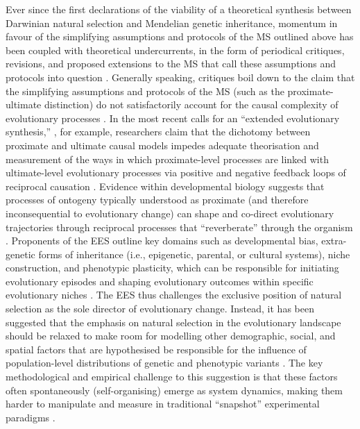 Ever since the first declarations of the viability of a theoretical synthesis between Darwinian natural selection and Mendelian genetic inheritance, momentum in favour of the simplifying assumptions and protocols of the MS outlined above has been coupled with theoretical undercurrents, in the form of periodical critiques, revisions, and proposed extensions to the MS that call these assumptions and protocols into question \citep[see, for example][]{Waddington1950, Pattee1971,Gould1980,Levins1985,Ingold1990,Ingold1995,Odling-Schmee2003,Piggliuci2007}. Generally speaking, critiques boil down to the claim that the simplifying assumptions and protocols of the MS (such as the proximate-ultimate distinction) do not satisfactorily account for the causal complexity of evolutionary processes \citep{Laland2011}. In the most recent calls for an ``extended evolutionary synthesis,'' \citep[EES, see][]{Pigliucci2007}, for example, researchers claim that the dichotomy between proximate and ultimate causal models impedes adequate theorisation and measurement of the ways in which proximate-level processes are linked with ultimate-level evolutionary processes via positive and negative feedback loops of reciprocal causation \citep{Pigliucci2007,Laland2011,Laland2013,Mesoudi2013,Laland2015}. Evidence within developmental biology suggests that processes of ontogeny typically understood as proximate (and therefore inconsequential to evolutionary change) can shape and co-direct evolutionary trajectories through reciprocal processes that ``reverberate'' through the organism \citep{Laland2013}. Proponents of the EES outline key domains such as developmental bias, extra-genetic forms of inheritance (i.e., epigenetic, parental, or cultural systems), niche construction, and phenotypic plasticity, which can be responsible for initiating evolutionary episodes and shaping evolutionary outcomes within specific evolutionary niches \citep{Laland2015}.  The EES thus challenges the exclusive position of natural selection as the sole director of evolutionary change.  Instead, it has been suggested that the emphasis on natural selection in the evolutionary landscape should be relaxed to make room for modelling other demographic, social, and spatial factors that are hypothesised be responsible for the influence of population-level distributions of genetic and phenotypic variants \citep{Mesoudi2013}.  The key methodological and empirical challenge to this suggestion is that these factors often spontaneously (self-organising) emerge as system dynamics, making them harder to manipulate and measure in traditional ``snapshot'' experimental paradigms \citep{Svensson2017}.

